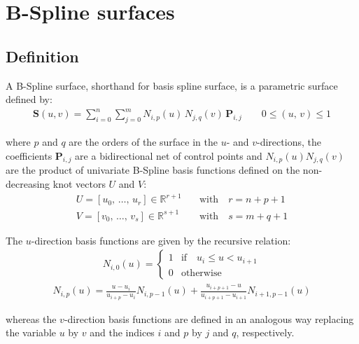\section{B-Spline surfaces}

\subsection{Definition}

A B-Spline surface, shorthand for basis spline surface, is a parametric surface defined by:
\begin{align}
\label{eq:def_bspline_surface}
\mathbf{S}(u,v)=\sum_{i=0}^{n} \sum_{j=0}^{m} N_{i,p}(u)\,  N_{j,q}(v)\, \mathbf{P}_{i,j} \quad \quad 0 \leq (u, \, v) \leq 1
\end{align}

where $p$ and $q$ are the orders of the surface in the $u$- and $v$-directions, the coefficients $\mathbf{P}_{i, j}$ are a bidirectional net of control points and $N_{i,p}(u)N_{j,q}(v)$ are the product of univariate B-Spline basis functions defined on the non-decreasing knot vectors $U$ and $V$:
\begin{align}
    U = [u_0,\, \dots,\, u_{r}] \in \mathds{R}^{r+1} \quad &\text{with} \quad r = n + p + 1 \\
    V = [v_0,\, \dots,\, v_{s}] \in \mathds{R}^{s+1} \quad &\text{with} \quad s = m + q + 1
\end{align}

The $u$-direction basis functions are given by the recursive relation:
\begin{align}
    N_{i,0}(u) =  \begin{cases}
    1& \mathrm{if} \quad u_{i}\leq u<u_{i+1}\\
    0& \mathrm{otherwise}
    \end{cases}
\end{align}
\begin{align}
\label{eq:def_bspline_recursive_2}
 N_{i,p}(u)={\frac {u-u_{i}}{u_{i+p}-u_{i}}}N_{i,p-1}(u)+{\frac {u_{i+p+1}-u}{u_{i+p+1}-u_{i+1}}}N_{i+1,p-1}(u)
\end{align}

whereas the $v$-direction basis functions are defined in an analogous way replacing the variable $u$ by $v$ and the indices $i$ and $p$ by $j$ and $q$, respectively.




